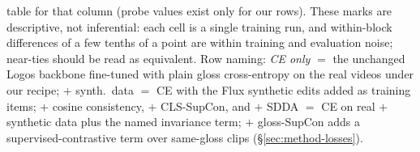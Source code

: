 \begin{table}[t]
{table for that column (probe values exist only for our rows). These
marks are descriptive, not inferential: each cell is a single training
run, and within-block differences of a few tenths of a point are within
training and evaluation noise; near-ties should be read as equivalent. Row naming: \emph{CE only}
$=$ the unchanged Logos backbone fine-tuned with plain gloss
cross-entropy on the real videos under our recipe; $+$ synth.\ data $=$
CE with the Flux synthetic edits added as training items; $+$ cosine
consistency, $+$ CLS-SupCon, and $+$ SDDA $=$ CE on real $+$ synthetic
data plus the named invariance term; $+$ gloss-SupCon adds a
supervised-contrastive term over same-gloss clips
(\S\ref{sec:method-losses}).
}
\label{tab:backbone_ft_retrieval}
\end{table}


